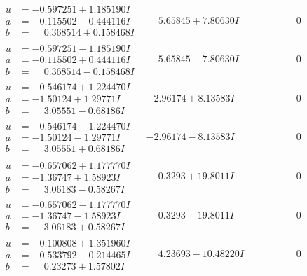 \documentclass[1p]{elsarticle_modified}
\theoremstyle{definition}
\begin{document}
$$\begin{array}{c|c|c}
\begin{aligned}
u &= -0.597251 + 1.185190 I \\
a &= -0.115502 - 0.444116 I \\
b &= \phantom{-}0.368514 + 0.158468 I\end{aligned}
 & \phantom{-}5.65845 + 7.80630 I & \phantom{-0.000000 } 0 \\ \hline\begin{aligned}
u &= -0.597251 - 1.185190 I \\
a &= -0.115502 + 0.444116 I \\
b &= \phantom{-}0.368514 - 0.158468 I\end{aligned}
 & \phantom{-}5.65845 - 7.80630 I & \phantom{-0.000000 } 0 \\ \hline\begin{aligned}
u &= -0.546174 + 1.224470 I \\
a &= -1.50124 + 1.29771 I \\
b &= \phantom{-}3.05551 - 0.68186 I\end{aligned}
 & -2.96174 + 8.13583 I & \phantom{-0.000000 } 0 \\ \hline\begin{aligned}
u &= -0.546174 - 1.224470 I \\
a &= -1.50124 - 1.29771 I \\
b &= \phantom{-}3.05551 + 0.68186 I\end{aligned}
 & -2.96174 - 8.13583 I & \phantom{-0.000000 } 0 \\ \hline\begin{aligned}
u &= -0.657062 + 1.177770 I \\
a &= -1.36747 + 1.58923 I \\
b &= \phantom{-}3.06183 - 0.58267 I\end{aligned}
 & \phantom{-}0.3293 + 19.8011 I & \phantom{-0.000000 } 0 \\ \hline\begin{aligned}
u &= -0.657062 - 1.177770 I \\
a &= -1.36747 - 1.58923 I \\
b &= \phantom{-}3.06183 + 0.58267 I\end{aligned}
 & \phantom{-}0.3293 - 19.8011 I & \phantom{-0.000000 } 0 \\ \hline\begin{aligned}
u &= -0.100808 + 1.351960 I \\
a &= -0.533792 - 0.214465 I \\
b &= \phantom{-}0.23273 + 1.57802 I\end{aligned}
 & \phantom{-}4.23693 - 10.48220 I & \phantom{-0.000000 } 0 \\ \hline\begin{aligned}

\end{aligned}
\end{array}$$
\end{document}
